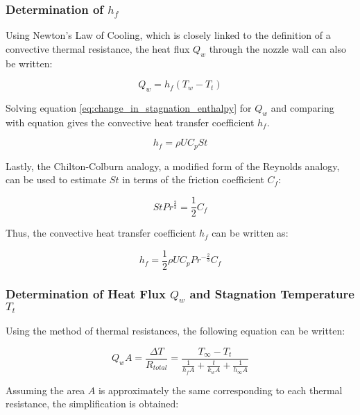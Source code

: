 \documentclass{article}
\begin{document}
\subsubsection{Determination of $h_f$}

Using Newton's Law of Cooling, which is closely linked to the definition of a convective thermal resistance, the heat flux $Q_w$ through the nozzle wall can also be written:

\begin{equation}
\label{eq:Qw_based_on_hf}
Q_w = h_f (T_w - T_t)
\end{equation}

Solving equation \ref{eq:change_in_stagnation_enthalpy} for $Q_w$ and comparing with equation \label{eq:Qw_based_on_hf} gives the convective heat transfer coefficient $h_f$.

\begin{equation}
\label{eq:hf_in_terms_of_St}
h_f = \rho U C_p St
\end{equation}

Lastly, the Chilton-Colburn analogy, a modified form of the Reynolds analogy, can be used to estimate $St$ in terms of the friction coefficient $C_f$:

\begin{equation}
\label{eq:chilton_colburn_analogy}
St Pr^{\frac{2}{3}} = \frac{1}{2} C_f
\end{equation}

Thus, the convective heat transfer coefficient $h_f$ can be written as:

\begin{equation}
\label{eq:hf_in_terms_of_Cf}
h_f = \frac{1}{2} \rho U C_p Pr^{- \frac{2}{3}} C_f
\end{equation}

\subsubsection{Determination of Heat Flux $Q_w$ and Stagnation Temperature $T_t$}

Using the method of thermal resistances, the following equation can be written:

\begin{equation}
Q_w A = \frac{\Delta T}{R_{total}} = \frac{T_{\infty} - T_t}{\frac{1}{h_f A} + \frac{t}{k_w A} + \frac{1}{h_{\infty} A}}
\end{equation}

Assuming the area $A$ is approximately the same corresponding to each thermal resistance, the simplification is obtained:
\end{document}
